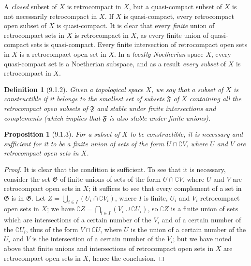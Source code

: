 \documentclass[oneside]{amsart}
\theoremstyle{ega-env-style}
\theoremstyle{ega-thm-env-style}
\newtheorem*{proposition}{Proposition}
\theoremstyle{ega-defn-env-style}
\newtheorem*{definition}{Definition}
\newcommand{\oldpage}[2][]{{\marginnote{\normalfont{\textbf{#1}~|~#2}}}\ignorespaces}
\let\EGAOriginalLabel\label
\renewcommand{\label}[1]{\phantomsection\EGAOriginalLabel{#1}}
\begin{document}
A \emph{closed} subset of $X$ is retrocompact in $X$, but a quasi-compact subset of $X$ is not necessarily retrocompact in $X$.
If $X$ is quasi-compact, every retrocompact open subset of $X$ is quasi-compact.
It is clear that every \emph{finite} union of retrocompact sets in $X$ is retrocompact in $X$, as every finite union of quasi-compact sets is quasi-compact.
Every finite intersection of retrocompact open sets in $X$ is a retrocompact open set in $X$.
In a \emph{locally Noetherian} space $X$, every quasi-compact set is a Noetherian subspace, and as a result \emph{every subset} of $X$ is retrocompact in $X$.

\begin{definition}[9.1.2]
\label{0.9.1.2}
Given a topological space $X$, we say that a subset of $X$ is \emph{constructible} if it belongs to the smallest set of subsets $\mathfrak{F}$ of $X$ containing all the retrocompact open subsets of $\mathfrak{F}$ and stable under finite intersections and complements (which implies that $\mathfrak{F}$ is also stable under finite unions).
\end{definition}

\begin{proposition}[9.1.3]
\label{0.9.1.3}
For a subset of $X$ to be constructible, it is necessary and sufficient for it to be a finite union of sets of the form $U\cap\complement{V}$, where $U$ and $V$ are retrocompact open sets in $X$.
\end{proposition}

\begin{proof}
It is clear that the condition is sufficient.
To see that it is necessary, consider the set $\mathfrak{G}$ of finite unions of sets of the form $U\cap\complement{V}$, where $U$ and $V$ are retrocompact open sets in $X$; it suffices to see that every complement of a set in $\mathfrak{G}$ is in $\mathfrak{G}$.
Let $Z=\bigcup_{i\in I}(U_i\cap\complement{V_i})$, where $I$ is finite, $U_i$ and $V_i$ retrocompact open sets in $X$; we have
$\complement{Z}=\bigcap_{i\in I}(V_i\cup\complement{U_i})$, so $\complement{Z}$ is a finite union of sets which are intersections of a certain number of the $V_i$ and of a certain number of the $\complement{U_i}$, thus of the form
\oldpage[0\textsubscript{III}]{13}
$V\cap\complement{U}$, where $U$ is the union of a certain number of the $U_i$ and $V$ is the intersection of a certain number of the $V_i$; but we have noted above that finite unions and intersections of retrocompact open sets in $X$ are retrocompact open sets in $X$, hence the conclusion.
\end{proof}
\end{document}
